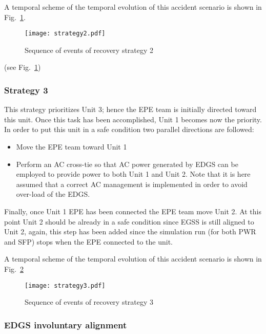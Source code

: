 A temporal scheme of the temporal evolution of this accident scenario is shown in Fig.~\ref{fig:strategy2Scheme}.  

\begin{figure}
    \centering
    \centerline{\texttt{[image: strategy2.pdf]}}
    \caption{Sequence of events of recovery strategy 2}
    \label{fig:strategy2Scheme}
\end{figure}
(see Fig.~\ref{fig:strategy2Scheme})


\subsubsection{Strategy 3}
\label{sec:strategy3}

This strategy prioritizes Unit 3; hence the EPE team is initially directed toward this unit. 
Once this task has been accomplished, Unit 1 becomes now the priority. In order to put this unit in a safe 
condition two parallel directions are followed: 

\begin{itemize}
  \item Move the EPE team toward Unit 1 
  \item Perform an AC cross-tie so that AC power generated by EDGS can be employed to provide power to both Unit
        1 and Unit 2. Note that it is here assumed that a correct AC management is implemented in order to avoid
        over-load of the EDGS.
\end{itemize}

Finally, once Unit 1 EPE has been connected the EPE team move Unit 2. At this point Unit 2 should be already in a 
safe condition since EGSS is still aligned to Unit 2, again, this step has been added since the simulation run (for 
both PWR and SFP) stops when the EPE connected to the unit.

A temporal scheme of the temporal evolution of this accident scenario is shown in Fig.~\ref{fig:strategy3Scheme}

\begin{figure}
    \centering
    \centerline{\texttt{[image: strategy3.pdf]}}
    \caption{Sequence of events of recovery strategy 3}
    \label{fig:strategy3Scheme}
\end{figure}

\subsubsection{EDGS involuntary alignment}
\label{sec:EDGSinvolAlign}

